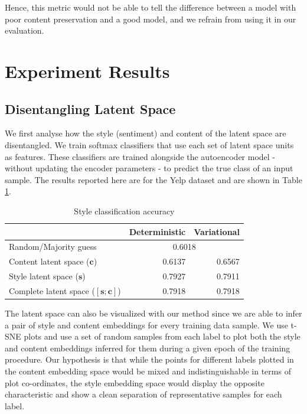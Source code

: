 Hence, this metric would not be able to tell the difference between a model with poor content preservation and a good model, and we refrain from using it in our evaluation.


\section{Experiment Results}

\subsection{Disentangling Latent Space}

We first analyse how the style (sentiment) and content of the latent space are disentangled. We train softmax classifiers that use each set of latent space units as features. These classifiers are trained alongside the autoencoder model - without updating the encoder parameters - to predict the true class of an input sample. The results reported here are for the Yelp dataset and are shown in Table \ref{tab:latent-space-classification}.

\begin{table}[ht]
	\centering
	\begin{tabular}{| l | r | r |}
		\hline
		                                        & \textbf{Deterministic}       & \textbf{Variational} \\
		\hline \hline
		Random/Majority guess                   & \multicolumn{2}{|c|}{0.6018}                        \\ \hline \hline
		Content latent space  ($\bm c$)         & 0.6137                       & 0.6567               \\ \hline
		Style latent space ($\bm s$)            & 0.7927                       & 0.7911               \\ \hline
		Complete latent space ($[\bm s;\bm c]$) & 0.7918                       & 0.7918               \\
		\hline
	\end{tabular}
	\caption{Style classification accuracy}
	\label{tab:latent-space-classification}
\end{table}

The latent space can also be visualized with our method since we are able to infer a pair of style and content embeddings for every training data sample. We use t-SNE plots \citep{maaten2008visualizing} and use a set of random samples from each label to plot both the style and content embeddings inferred for them during a given epoch of the training procedure. Our hypothesis is that while the points for different labels plotted in the content embedding space would be mixed and indistinguishable in terms of plot co-ordinates, the style embedding space would display the opposite characteristic and show a clean separation of representative samples for each label.

